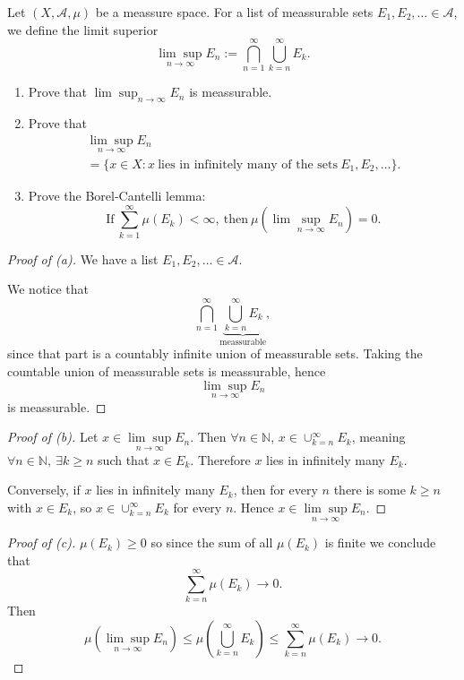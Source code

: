\begin{prob*}[6]
    Let $(X,\mathcal A,\mu)$ be a meassure space. For a list of 
    meassurable sets $E_1,E_2,\ldots \in \mathcal A$, we define 
    the limit superior 
    \[
        \underset{n\to\infty}{\lim\sup}E_n := 
        \bigcap_{n=1}^\infty \bigcup_{k=n}^\infty E_k.
    \]

    \begin{enumerate}[label=\alph*)]
        \item Prove that $\lim\sup_{n\to\infty}E_n$ is meassurable.
        \item Prove that 
            \begin{align*}
                \underset{n\to\infty}{\lim\sup}E_n 
                \\ = \{x \in X : x \ \text{lies in infinitely 
                many of the sets} \ E_1,E_2,\ldots\}.
            \end{align*}
        \item Prove the Borel-Cantelli lemma: 
            \[
                \text{If} \ \sum_{k=1}^\infty \mu(E_k) < \infty, 
                \ \text{then} \ 
                \mu(\lim\sup_{n\to\infty} E_n) = 0.
            \]
    \end{enumerate}
\end{prob*}
\begin{proof}[Proof of (a)]
    We have a list $E_1,E_2,\ldots \in \mathcal A$.

    We notice that 
    \[
        \bigcap_{n=1}^\infty 
        \underbrace{\bigcup_{k=n}^\infty E_k}_{\text{meassurable}}, 
    \]
    since that part is a countably infinite union of meassurable 
    sets. Taking the countable union of meassurable sets 
    is meassurable, hence 
    \[
        \underset{n\to\infty}{\lim\sup}E_n
    \]
    is meassurable.
\end{proof}
\begin{proof}[Proof of (b)]
    Let $x \in \underset{n\to\infty}{\lim\sup}E_n$.
    Then $\forall n \in \mathbb N$, $x \in \cup_{k=n}^\infty E_k$, 
    meaning $\forall n \in \mathbb N, \ \exists k \geq n$ such 
    that $x \in E_k$. Therefore $x$ lies in infinitely many 
    $E_k$. 

    Conversely, if $x$ lies in infinitely many $E_k$, then for 
    every $n$ there is some $k \geq n$ with $x \in E_k$, so 
    $x \in \cup_{k=n}^\infty E_k$ for every $n$. 
    Hence $x \in \underset{n\to\infty}{\lim\sup}E_n$.
\end{proof}
\begin{proof}[Proof of (c)]
    $\mu(E_k) \geq 0$ so since the sum of all $\mu(E_k)$ is finite 
    we conclude that 
    \[
        \sum_{k=n}^\infty \mu(E_k) \to 0.
    \]
    Then 
    \[
        \mu(\underset{n\to\infty}{\lim\sup}E_n) 
        \leq 
        \mu \left( \bigcup_{k=n}^\infty E_k \right)
        \leq 
        \sum_{k=n}^\infty \mu(E_k) \to 0.
    \]
\end{proof}



